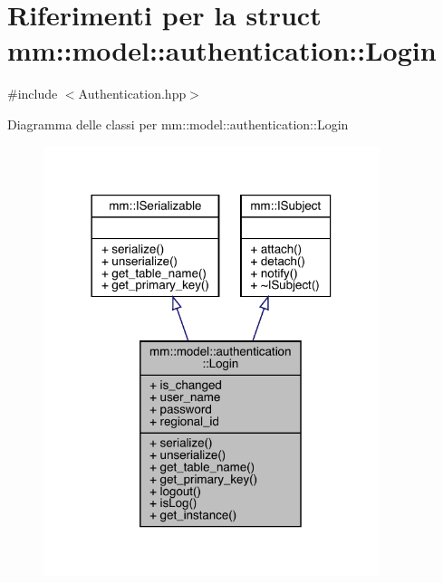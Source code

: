\hypertarget{structmm_1_1model_1_1authentication_1_1_login}{}\section{Riferimenti per la struct mm\+:\+:model\+:\+:authentication\+:\+:Login}
\label{structmm_1_1model_1_1authentication_1_1_login}


{\ttfamily \#include $<$Authentication.\+hpp$>$}



Diagramma delle classi per mm\+:\+:model\+:\+:authentication\+:\+:Login\nopagebreak
\begin{figure}[H]
\begin{center}
\leavevmode
\includegraphics[width=278pt]{dc/d2d/structmm_1_1model_1_1authentication_1_1_login__inherit__graph}
\end{center}
\end{figure}


